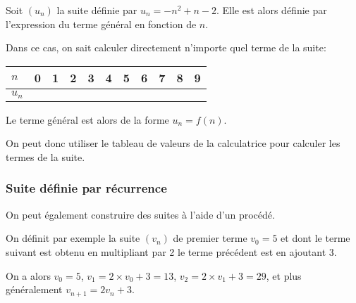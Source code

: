 \documentclass[a4paper]{article}
\begin{document}
		\begin{example}{}{}
			Soit $(u_n)$ la suite définie par $u_n=-n^2+n-2$. Elle est alors définie par l'expression du terme général en fonction de $n$.

			Dans ce cas, on sait calculer directement n'importe quel terme de la suite:
		  \begin{center}
        \renewcommand{\arraystretch}{2.0}
        \begin{tabular}{|*{11}{C{1.2cm}|}}
            \hline
            $n$ & 0 & 1 & 2 & 3 & 4 & 5 & 6 & 7 & 8 & 9 \\
            \hline
            $u_n$ & & & & & & & & & & \\
            \hline
        \end{tabular}
      \end{center}
		\end{example}
		\begin{remark}{}{}
			Le terme général est alors de la forme $u_n=f(n)$.
      
      On peut donc utiliser le tableau de valeurs de la calculatrice pour calculer les termes de la suite.
		\end{remark}


		\subsubsection{Suite définie par récurrence}
		\begin{example}{}{}
			On peut également construire des suites à l'aide d'un procédé. 
      
      On définit par exemple la suite $(v_n)$ de premier terme $v_0=5$
      et dont le terme suivant est obtenu en multipliant par 2 le terme précédent est en ajoutant $3$.\\

      \begin{center}
      \end{center}

			On a alors $v_0=5$, $v_1=2\times v_0 +3=13$, $v_2=2\times v_1+3=29$, et plus généralement $v_{n+1}=2v_n+3$.
		\end{example}
\end{document}
